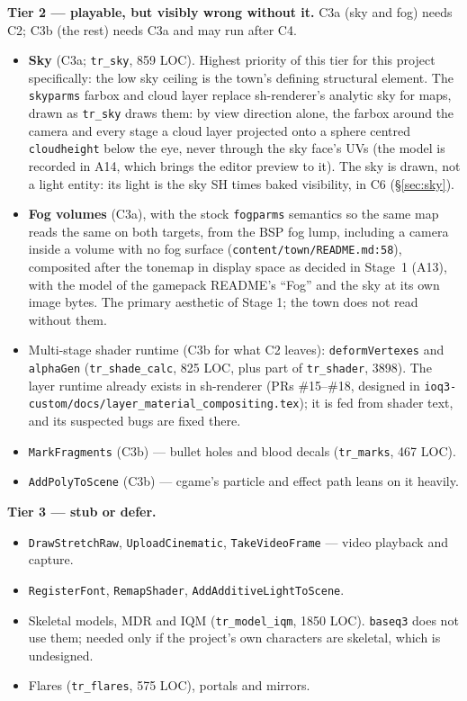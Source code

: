 \documentclass[11pt,a4paper]{article}
\begin{document}
\textbf{Tier 2 --- playable, but visibly wrong without it.} C3a (sky and fog) needs C2; C3b (the
rest) needs C3a and may run after C4.
\begin{itemize}
\item \textbf{Sky} (C3a; \texttt{tr\_sky}, 859 LOC). Highest priority of this tier for this project
  specifically: the low sky ceiling is the town's defining structural element. The
  \texttt{skyparms} farbox and cloud layer replace sh-renderer's analytic sky for maps, drawn as
  \texttt{tr\_sky} draws them: by view direction alone, the farbox around the camera and every stage
  a cloud layer projected onto a sphere centred \texttt{cloudheight} below the eye, never through
  the sky face's UVs (the model is recorded in A14, which brings the editor preview to it). The sky is drawn,
  not a light entity: its light is the sky SH times baked visibility, in C6 (§\ref{sec:sky}).
\item \textbf{Fog volumes} (C3a), with the stock \texttt{fogparms} semantics so the same map reads
  the same on both targets, from the BSP fog lump, including a camera inside a volume with no fog
  surface (\texttt{content/town/README.md:58}), composited after the tonemap in display space as
  decided in Stage~1 (A13), with the model of the gamepack README's ``Fog'' and the sky at its own
  image bytes. The primary aesthetic of Stage 1; the town does not read without them.
\item Multi-stage shader runtime (C3b for what C2 leaves): \texttt{deformVertexes} and
  \texttt{alphaGen} (\texttt{tr\_shade\_calc}, 825 LOC, plus part of \texttt{tr\_shader}, 3898).
  The layer runtime already exists in sh-renderer (PRs \#15--\#18, designed in
  \texttt{ioq3-custom/docs/layer\_material\_compositing.tex}); it is fed from shader text, and its
  suspected bugs are fixed there.
\item \texttt{MarkFragments} (C3b) --- bullet holes and blood decals (\texttt{tr\_marks}, 467 LOC).
\item \texttt{AddPolyToScene} (C3b) --- cgame's particle and effect path leans on it heavily.
\end{itemize}

\textbf{Tier 3 --- stub or defer.}
\begin{itemize}
\item \texttt{DrawStretchRaw}, \texttt{UploadCinematic}, \texttt{TakeVideoFrame} --- video
  playback and capture.
\item \texttt{RegisterFont}, \texttt{RemapShader}, \texttt{AddAdditiveLightToScene}.
\item Skeletal models, MDR and IQM (\texttt{tr\_model\_iqm}, 1850 LOC). \texttt{baseq3} does not
  use them; needed only if the project's own characters are skeletal, which is undesigned.
\item Flares (\texttt{tr\_flares}, 575 LOC), portals and mirrors.
\end{itemize}
\end{document}
